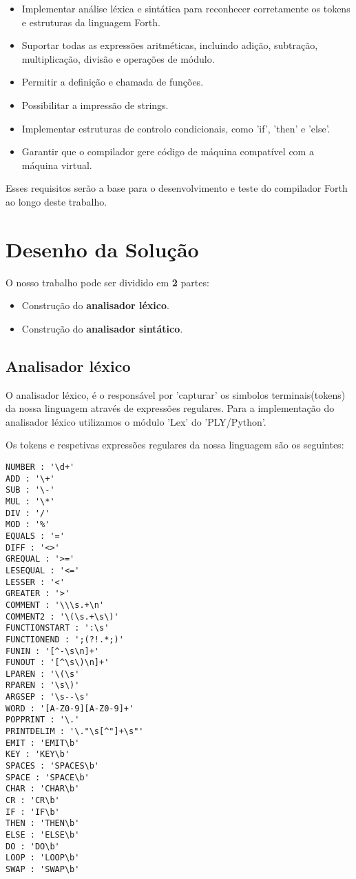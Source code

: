 \documentclass{predef}
\begin{document}
\begin{itemize}
    \item Implementar análise léxica e sintática para reconhecer corretamente os tokens e estruturas da linguagem Forth.
    \item Suportar todas as expressões aritméticas, incluindo adição, subtração, multiplicação, divisão e operações de módulo.
    \item Permitir a definição e chamada de funções.
    \item Possibilitar a impressão de strings.
    \item Implementar estruturas de controlo condicionais, como 'if', 'then' e 'else'.
    \item Garantir que o compilador gere código de máquina compatível com a máquina virtual.
\end{itemize}

Esses requisitos serão a base para o desenvolvimento e teste do compilador Forth ao longo deste trabalho.


\newpage
\section{Desenho da Solução}
O nosso trabalho pode ser dividido em \textbf{2} partes:
\begin{itemize}
\item Construção do \textbf{analisador léxico}.
\item Construção do \textbf{analisador sintático}.
\end{itemize}

\subsection{Analisador léxico}
O analisador léxico, é o responsável por ’capturar’ os simbolos terminais(tokens) da nossa linguagem
através de expressões regulares. Para a implementação do analisador léxico utilizamos o módulo ’Lex’ do
’PLY/Python’.

Os tokens e respetivas expressões regulares da nossa linguagem são os seguintes:

\begin{verbatim}
NUMBER : '\d+'
ADD : '\+'
SUB : '\-'
MUL : '\*'
DIV : '/'
MOD : '%'
EQUALS : '='
DIFF : '<>'
GREQUAL : '>='
LESEQUAL : '<='
LESSER : '<'
GREATER : '>'
COMMENT : '\\\s.+\n'
COMMENT2 : '\(\s.+\s\)'
FUNCTIONSTART : ':\s'
FUNCTIONEND : ';(?!.*;)'
FUNIN : '[^-\s\n]+'
FUNOUT : '[^\s\)\n]+'
LPAREN : '\(\s'
RPAREN : '\s\)'
ARGSEP : '\s--\s'
WORD : '[A-Z0-9][A-Z0-9]+'
POPPRINT : '\.'
PRINTDELIM : '\."\s[^"]+\s"'
EMIT : 'EMIT\b'
KEY : 'KEY\b'
SPACES : 'SPACES\b'
SPACE : 'SPACE\b'
CHAR : 'CHAR\b'
CR : 'CR\b'
IF : 'IF\b'
THEN : 'THEN\b'
ELSE : 'ELSE\b'
DO : 'DO\b'
LOOP : 'LOOP\b'
SWAP : 'SWAP\b'
\end{verbatim}
\end{document}

